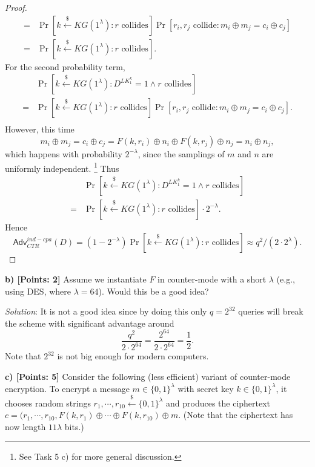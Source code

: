 \documentclass[12pt]{article}
\newcommand{\bits}{\{0,1\}}
\newcommand{\getsr}{\stackrel{\$}{\gets}}
\newcommand{\Adv}{\textsf{Adv}}
\theoremstyle{definition}
\begin{document}
\begin{proof}
$$\begin{aligned}
=& \Pr[k \getsr KG(1^\lambda): \textrm{$r$ collides}]\Pr[\textrm{$r_i, r_j$ collide} : m_i \oplus m_j = c_i \oplus c_j] \\
=& \Pr[k \getsr KG(1^\lambda): \textrm{$r$ collides}].
\end{aligned}$$
For the second probability term,
$$\begin{aligned}
& \Pr[k \getsr KG(1^\lambda) : D^{LK_1^k}=1 \wedge \textrm{$r$ collides}] \\
=& \Pr[k \getsr KG(1^\lambda): \textrm{$r$ collides}]\Pr[\textrm{$r_i, r_j$ collide} : m_i \oplus m_j = c_i \oplus c_j]. \\
\end{aligned}$$
However, this time 
$$m_i \oplus m_j = c_i \oplus c_j = F(k, r_i) \oplus n_i \oplus F(k, r_j) \oplus n_j = n_i \oplus n_j,$$
which happens with probability $2^{-\lambda}$, since the samplings of $m$ and $n$ are uniformly independent. \footnote{See Task 5 c) for more general discussion.}
Thus
$$\begin{aligned}
& \Pr[k \getsr KG(1^\lambda) : D^{LK_1^k}=1 \wedge \textrm{$r$ collides}] \\
=& \Pr[k \getsr KG(1^\lambda): \textrm{$r$ collides}]\cdot 2^{-\lambda}. 
\end{aligned}$$
Hence 
$$\Adv_{CTR}^{ind-cpa}(D) = (1-2^{-\lambda}) \Pr[k \getsr KG(1^\lambda): \textrm{$r$ collides}] \approx q^2/(2\cdot 2^\lambda).$$
\end{proof}

{\bf b) [Points: 2]} Assume we instantiate $F$ in counter-mode with a short $\lambda$ (e.g., using DES, where $\lambda = 64$). Would this be a good idea?

\emph{Solution}: It is not a good idea since by doing this only $q = 2^{32}$ queries will break the scheme with significant advantage around
$$\frac{q^2}{2\cdot 2^{64}} = \frac{2^{64}}{2\cdot 2^{64}} = \frac{1}{2}.$$
Note that $2^{32}$ is not big enough for modern computers.

{\bf c) [Points: 5]} Consider the following (less efficient) variant of counter-mode encryption.
To encrypt a message $m \in \bits^\lambda$ with secret key $k \in \bits^\lambda$, it chooses random strings $r_1, \cdots, r_{10} \getsr \bits^\lambda$ and produces the ciphertext $c = (r_1, \cdots, r_{10}, F(k, r_1) \oplus \cdots \oplus F(k, r_{10}) \oplus m$. (Note that the ciphertext has now length $11\lambda$ bits.)
\end{document}
